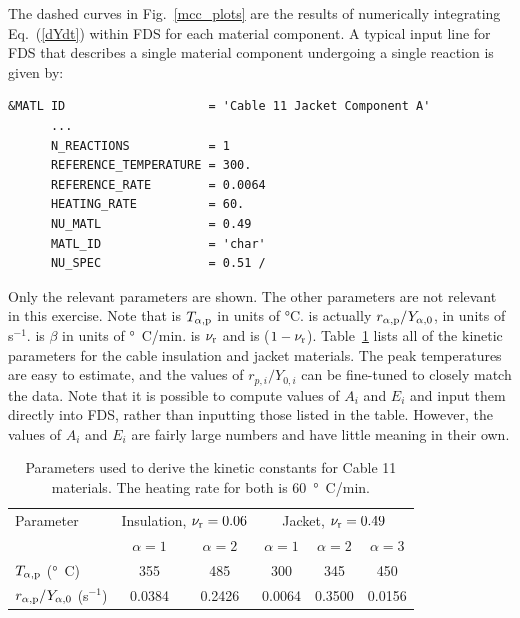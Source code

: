 \documentclass[11pt]{book}
\begin{document}
The dashed curves in Fig.~\ref{mcc_plots} are the results of numerically integrating Eq.~(\ref{dYdt}) within FDS for each material component. A typical input line for FDS that describes a single material component undergoing a single reaction is given by:
\begin{lstlisting}
&MATL ID                    = 'Cable 11 Jacket Component A'
      ...
      N_REACTIONS           = 1
      REFERENCE_TEMPERATURE = 300.
      REFERENCE_RATE        = 0.0064
      HEATING_RATE          = 60.
      NU_MATL               = 0.49
      MATL_ID               = 'char'
      NU_SPEC               = 0.51 /
\end{lstlisting}
Only the relevant parameters are shown. The other parameters are not relevant in this exercise. Note that  is $T_{\alpha,{\rm p}}$ in units of \si{\degreeCelsius}.  is actually $r_{\alpha,{\rm p}}/Y_{\alpha,0}$, in units of s$^{-1}$.  is $\beta$ in units of \si{\degree C}/min.  is $\nu_{\rm r}$ and  is ($1-\nu_{\rm r}$). Table~\ref{cable_parameters} lists all of the kinetic parameters for the cable insulation and jacket materials. The peak temperatures are easy to estimate, and the values of $r_{p,i}/Y_{0,i}$ can be fine-tuned to closely match the data. Note that it is possible to compute values of $A_i$ and $E_i$ and input them directly into FDS, rather than inputting those listed in the table. However, the values of $A_i$ and $E_i$ are fairly large numbers and have little meaning in their own.

\begin{table}[!htb]
\centering
\caption[Parameters for kinetic constants for cable materials]{Parameters used to derive the kinetic constants for Cable 11 materials. The heating rate for both is 60~\si{\degree C}/min.}
\label{cable_parameters}
\begin{tabular}{|l||c|c||c|c|c|}
\hline
Parameter                                       & \multicolumn{2}{|c||}{Insulation, $\nu_{\rm r}=0.06$ } &  \multicolumn{3}{|c|}{Jacket, $\nu_{\rm r}=0.49$}     \\ \cline{2-6}
                                                & $\alpha=1$    & $\alpha=2$                             &  $\alpha=1$  & $\alpha=2$   & $\alpha=3$              \\ \hline \hline
$T_{\alpha,{\rm p}}$ (\si{\degree C})           & 355           & 485                                    &  300         & 345          & 450                     \\ \hline
$r_{\alpha,{\rm p}}/Y_{\alpha,0}$ (s$^{-1}$)    & 0.0384        & 0.2426                                 &  0.0064      & 0.3500       & 0.0156                  \\ \hline
\end{tabular}
\end{table}
\end{document}
